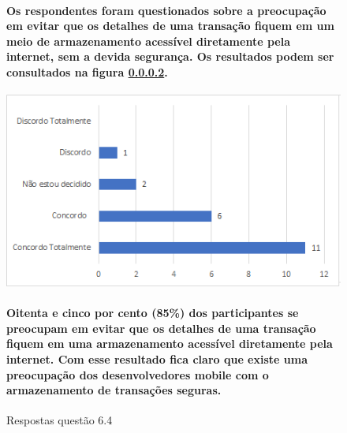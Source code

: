 \begin{figure}[!t]
\centering
\paragraph{ Os respondentes foram questionados sobre a preocupação em evitar que os detalhes de uma transação fiquem em um meio de armazenamento acessível diretamente pela internet, sem a devida segurança. Os resultados podem ser consultados na figura \ref{fig:6.4}.}
\includegraphics[scale=0.7]{figuras das questoes/6.4.png}
\caption{Respostas questão 6.4}
\paragraph{Oitenta e cinco por cento (85{\%}) dos participantes se preocupam em evitar que os detalhes de uma transação fiquem em uma armazenamento acessível diretamente pela internet. Com esse resultado fica claro que existe uma preocupação dos desenvolvedores mobile com o armazenamento de transações seguras. }
\label{fig:6.4}
\end{figure}

